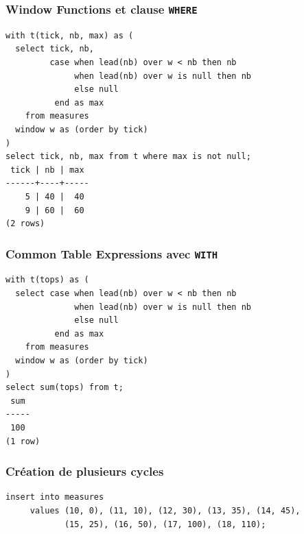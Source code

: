 \documentclass{beamer}
\begin{document}
\begin{frame}[fragile]
  \frametitle{Window Functions et clause \texttt{WHERE}}

\begin{verbatim}
with t(tick, nb, max) as (
  select tick, nb,
         case when lead(nb) over w < nb then nb
              when lead(nb) over w is null then nb
              else null
          end as max
    from measures
  window w as (order by tick)
)
select tick, nb, max from t where max is not null;
 tick | nb | max 
------+----+-----
    5 | 40 |  40
    9 | 60 |  60
(2 rows)
\end{verbatim}
\end{frame}

\begin{frame}[fragile]
  \frametitle{Common Table Expressions avec \texttt{WITH}}

\begin{verbatim}
with t(tops) as (
  select case when lead(nb) over w < nb then nb
              when lead(nb) over w is null then nb
              else null
          end as max
    from measures
  window w as (order by tick)
)
select sum(tops) from t;
 sum 
-----
 100
(1 row)
\end{verbatim}
\end{frame}


\begin{frame}[fragile]
  \frametitle{Création de plusieurs cycles}

\begin{verbatim}
insert into measures
     values (10, 0), (11, 10), (12, 30), (13, 35), (14, 45),
            (15, 25), (16, 50), (17, 100), (18, 110);
\end{verbatim}
\end{frame}
\end{document}
